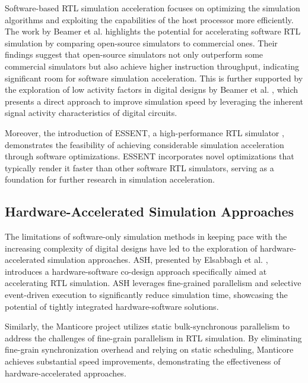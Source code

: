 \documentclass[conference]{IEEEtran}
\begin{document}
Software-based RTL simulation acceleration focuses on optimizing the simulation algorithms and exploiting the capabilities of the host processor more efficiently. The work by Beamer et al. \cite{beamerCaseAcceleratingSoftware2020} highlights the potential for accelerating software RTL simulation by comparing open-source simulators to commercial ones. Their findings suggest that open-source simulators not only outperform some commercial simulators but also achieve higher instruction throughput, indicating significant room for software simulation acceleration. This is further supported by the exploration of low activity factors in digital designs by Beamer et al. \cite{beamerEfficientlyExploitingLow2020b}, which presents a direct approach to improve simulation speed by leveraging the inherent signal activity characteristics of digital circuits.

Moreover, the introduction of ESSENT, a high-performance RTL simulator \cite{beamerESSENTHighPerformanceRTL}, demonstrates the feasibility of achieving considerable simulation acceleration through software optimizations. ESSENT incorporates novel optimizations that typically render it faster than other software RTL simulators, serving as a foundation for further research in simulation acceleration.

\subsection{Hardware-Accelerated Simulation Approaches}

The limitations of software-only simulation methods in keeping pace with the increasing complexity of digital designs have led to the exploration of hardware-accelerated simulation approaches. ASH, presented by Elsabbagh et al. \cite{elsabbaghAcceleratingRTLSimulation2023}, introduces a hardware-software co-design approach specifically aimed at accelerating RTL simulation. ASH leverages fine-grained parallelism and selective event-driven execution to significantly reduce simulation time, showcasing the potential of tightly integrated hardware-software solutions.

Similarly, the Manticore project \cite{emamiManticoreHardwareAcceleratedRTL2023} utilizes static bulk-synchronous parallelism to address the challenges of fine-grain parallelism in RTL simulation. By eliminating fine-grain synchronization overhead and relying on static scheduling, Manticore achieves substantial speed improvements, demonstrating the effectiveness of hardware-accelerated approaches.
\end{document}

